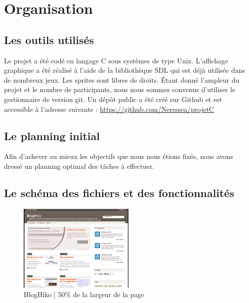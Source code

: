 \section{Organisation}

\subsection{Les outils utilisés}

Le projet a été codé en langage C sous systèmes de type Unix. L’affichage graphique a été réalisé à l’aide de la
bibliothèque SDL qui est déjà utilisée dans de nombreux jeux. Les sprites sont libres de droits. Étant donné l’ampleur du projet et le
nombre de participants, nous nous sommes convenus d’utiliser le gestionnaire de version git. Un dépôt public a été créé sur Github et est accessible à l'adresse suivante : \url{https://github.com/Neressea/projetC}

\subsection{Le planning initial}

Afin d'achever au mieux les objectifs que nous nous étions fixés, nous avons dressé un planning optimal des tâches à effectuer.

\subsection{Le schéma des fichiers et des fonctionnalités}


\begin{figure}[!ht]
    \center
    \includegraphics[width=0.5\textwidth]{./images/bloghiko.jpg}
    \caption{BlogHiko | 50\% de la largeur de la page}
\end{figure}


